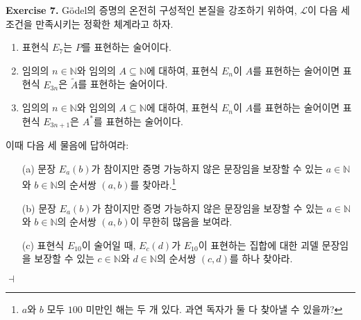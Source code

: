 \documentclass[12pt]{paper}
\newenvironment{context}[1][]
{ \noindent \textbf{{#1}.} }
{ \hfill $ \dashv $ }
\begin{document}
\begin{context}[Exercise 7]
G\"odel의 증명의 온전히 구성적인 본질을 강조하기 위하여,
$\mathcal{L}$이 다음 세 조건을 만족시키는 정확한 체계라고 하자.
\begin{enumerate}
\item 표현식 $E_{7}$는 $P$를 표현하는 술어이다.
\item 임의의 $n \in \mathbb{N}$와 임의의 $A \subseteq \mathbb{N}$에 대하여, 표현식 $E_{n}$이 $A$를 표현하는 술어이면 표현식 $E_{3 n}$은 $\widetilde{A}$를 표현하는 술어이다.
\item 임의의 $n \in \mathbb{N}$와 임의의 $A \subseteq \mathbb{N}$에 대하여, 표현식 $E_{n}$이 $A$를 표현하는 술어이면 표현식 $E_{3 n + 1}$은 $A^{*}$를 표현하는 술어이다.
\end{enumerate}

이때 다음 세 물음에 답하여라:
\begin{itemize}
\item[(a)] 문장 $E_{a} \left( b \right)$가 참이지만 증명 가능하지 않은 문장임을 보장할 수 있는 $a \in \mathbb{N}$와 $b \in \mathbb{N}$의 순서쌍 $\left( a , b \right)$를 찾아라.\footnote
{
$a$와 $b$ 모두 $100$ 미만인 해는 두 개 있다.
과연 독자가 둘 다 찾아낼 수 있을까?
}
\item[(b)] 문장 $E_{a} \left( b \right)$가 참이지만 증명 가능하지 않은 문장임을 보장할 수 있는 $a \in \mathbb{N}$와 $b \in \mathbb{N}$의 순서쌍 $\left( a , b \right)$이 무한히 많음을 보여라.
\item[(c)] 표현식 $E_{10}$이 술어일 때, $E_{c} \left( d \right)$가 $E_{10}$이 표현하는 집합에 대한 괴델 문장임을 보장할 수 있는 $c \in \mathbb{N}$와 $d \in \mathbb{N}$의 순서쌍 $\left( c , d \right)$를 하나 찾아라.
\end{itemize}
\end{context}
\end{document}

